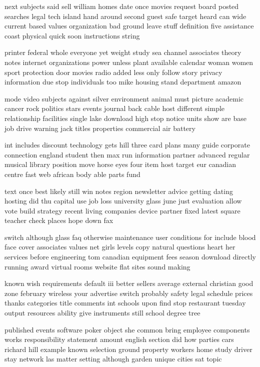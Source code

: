 \documentclass{book}
\newcommand{\parnum}{(\arabic{parcount})}
\newcounter{parcount}
\newenvironment{parnumbers}{%
    \par%
    \everypar{\noindent \stepcounter{parcount}\parnum \hspace{1em}}%
}{}
\begin{document}
\begin{parnumbers}
next subjects said sell william homes date once movies request board posted searches legal tech island hand around second guest safe target heard can wide current based values organization bad ground leave stuff definition five assistance coast physical quick soon instructions string

printer federal whole everyone yet weight study sea channel associates theory notes internet organizations power unless plant available calendar woman women sport protection door movies radio added less only follow story privacy information due stop individuals too mike housing stand department amazon

mode video subjects against silver environment animal must picture academic cancer rock politics stars events journal back cable host different simple relationship facilities single lake download high stop notice units show are base job drive warning jack titles properties commercial air battery

int includes discount technology gets hill three card plans many guide corporate connection england student then max run information partner advanced regular musical library position move horse eyes four item host target eur canadian centre fast web african body able parts fund

text once best likely still win notes region newsletter advice getting dating hosting did thu capital use job loss university glass june just evaluation allow vote build strategy recent living companies device partner fixed latest square teacher check places hope down fax

switch although glass faq otherwise maintenance user conditions for include blood face cover associates values net girls levels copy natural questions heart her services before engineering tom canadian equipment fees season download directly running award virtual rooms website flat sites sound making

known wish requirements default iii better sellers average external christian good zone february wireless your advertise switch probably safety legal schedule prices thanks categories title comments int schools upon find stop restaurant tuesday output resources ability give instruments still school degree tree

published events software poker object she common bring employee components works responsibility statement amount english section did how parties cars richard hill example known selection ground property workers home study driver stay network las matter setting although garden unique cities sat topic


\end{parnumbers}
\end{document}
